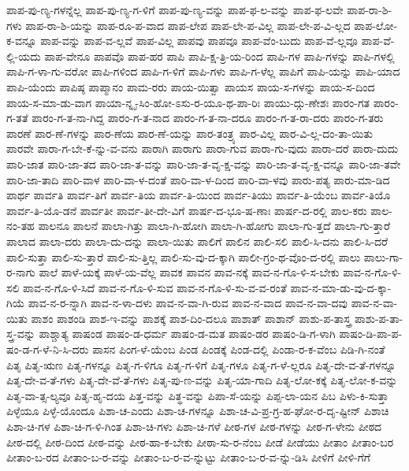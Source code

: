 {ಪಾಪ-ಪು-ಣ್ಯ-ಗಳನ್ನೆಲ್ಲ
ಪಾಪ-ಪು-ಣ್ಯ-ಗ-ಳಿಗೆ
ಪಾಪ-ಪು-ಣ್ಯ-ವನ್ನು
ಪಾಪ-ಫ-ಲ-ವನ್ನು
ಪಾಪ-ಫ-ಲವೇ
ಪಾಪ-ರಾ-ಶಿ-ಗಳು
ಪಾಪ-ರಾ-ಶಿ-ಯನ್ನು
ಪಾಪ-ರೂ-ಪ-ವಾದ
ಪಾಪ-ಲೇಪ
ಪಾಪ-ಲೇ-ಪ-ವಿಲ್ಲ
ಪಾಪ-ಲೇ-ಪ-ವಿ-ಲ್ಲದ
ಪಾಪ-ಲೋ-ಕ-ವನ್ನೂ
ಪಾಪ-ವನ್ನು
ಪಾಪ-ವ-ಲ್ಲವೆ
ಪಾಪ-ವಿಲ್ಲ
ಪಾಪವು
ಪಾಪವೂ
ಪಾಪ-ವೆಂ-ಬುದು
ಪಾಪ-ವೆ-ಲ್ಲವೂ
ಪಾಪ-ವೆ-ಲ್ಲಿ-ಯದು
ಪಾಪ-ವೇನೂ
ಪಾಪವೊ
ಪಾಪ-ಹರ
ಪಾಪಿ
ಪಾಪಿ-ಕ್ಷ-ತ್ರಿ-ಯ-ರಿಂದ
ಪಾಪಿ-ಗಳ
ಪಾಪಿ-ಗಳನ್ನು
ಪಾಪಿ-ಗಳಲ್ಲಿ
ಪಾಪಿ-ಗ-ಳಾ-ಗು-ವರೋ
ಪಾಪಿ-ಗಳಿಂದ
ಪಾಪಿ-ಗ-ಳಿಗೆ
ಪಾಪಿ-ಗಳು
ಪಾಪಿ-ಗ-ಳೆಲ್ಲ
ಪಾಪಿಗೆ
ಪಾಪಿ-ಯನ್ನು
ಪಾಪಿ-ಯಾದ
ಪಾಪಿ-ಯೆಂದು
ಪಾಪಿಷ್ಠ
ಪಾಪ್ಮಾನಂ
ಪಾಮ-ರರು
ಪಾಯ-ಯಿತ್ವಾ
ಪಾಯಸ
ಪಾಯ-ಸ-ಗಳನ್ನು
ಪಾಯ-ಸ-ದಿಂದ
ಪಾಯ-ಸ-ಮಾ-ಡು-ವಾಗ
ಪಾಯಾ-ನ್ನೃ-ಸಿಂ-ಹೋ-ಽಸು-ರ-ಯೂ-ಥ-ಪಾ-ರಿಃ
ಪಾಯು-ದ್ಗು-ಣೇಶಃ
ಪಾರಂ-ಗತ
ಪಾರಂ-ಗ-ತತೆ
ಪಾರಂ-ಗ-ತ-ನಾ-ಗಿದ್ದ
ಪಾರಂ-ಗ-ತ-ನಾದ
ಪಾರಂ-ಗ-ತ-ನಾ-ದರೂ
ಪಾರಂ-ಗ-ತ-ರಾ-ದರು
ಪಾರಂ-ಗ-ತರು
ಪಾರಣೆ
ಪಾರ-ಣೆ-ಗಳನ್ನು
ಪಾರ-ಣೆಯ
ಪಾರ-ಣೆ-ಯನ್ನು
ಪಾರ-ತಂತ್ರ್ಯ
ಪಾರ-ವಿಲ್ಲ
ಪಾರ-ವಿ-ಲ್ಲ-ದಂ-ತಾ-ಯಿತು
ಪಾರವೇ
ಪಾರಾ-ಗ-ಬೇ-ಕೆ-ನ್ನು-ವ-ವನು
ಪಾರಾಗಿ
ಪಾರಾಗು
ಪಾರಾ-ಗುವ
ಪಾರಾ-ಗು-ವುದು
ಪಾರಾ-ದರೆ
ಪಾರಾ-ದುದು
ಪಾರಿ-ಜಾತ
ಪಾರಿ-ಜಾ-ತದ
ಪಾರಿ-ಜಾ-ತ-ವನ್ನು
ಪಾರಿ-ಜಾ-ತ-ವೃ-ಕ್ಷ-ವನ್ನು
ಪಾರಿ-ಜಾ-ತ-ವೃ-ಕ್ಷ-ವನ್ನೂ
ಪಾರಿ-ಜಾ-ತವೇ
ಪಾರಿ-ಜಾ-ತಾದಿ
ಪಾರಿ-ವಾಳ
ಪಾರಿ-ವಾ-ಳ-ದಂತೆ
ಪಾರಿ-ವಾ-ಳ-ದಿಂದ
ಪಾರಿ-ವಾ-ಳವು
ಪಾರು-ಪತ್ಯ
ಪಾರು-ಮಾ-ಡಿದ
ಪಾರ್ಥ
ಪಾರ್ವತಿ
ಪಾರ್ವ-ತಿಗೆ
ಪಾರ್ವ-ತಿಯ
ಪಾರ್ವ-ತಿ-ಯಿಂದ
ಪಾರ್ವ-ತಿಯು
ಪಾರ್ವ-ತಿ-ಯೆಂಬ
ಪಾರ್ವ-ತಿಯೊ
ಪಾರ್ವ-ತಿ-ಯೊ-ಡನೆ
ಪಾರ್ವತೀ
ಪಾರ್ವ-ತೀ-ದೇ-ವಿಗೆ
ಪಾರ್ಷ-ದ-ಭೂ-ಷ-ಣಾಃ
ಪಾರ್ಷ-ದ-ರಲ್ಲಿ
ಪಾಲ-ಕರು
ಪಾಲ-ನಂ-ತಹ
ಪಾಲನೂ
ಪಾಲನೆ
ಪಾಲಾ-ಗಿತ್ತು
ಪಾಲಾ-ಗಿ-ಹೋಗಿ
ಪಾಲಾ-ಗಿ-ಹೋಗು
ಪಾಲಾ-ಗು-ತ್ತದೆ
ಪಾಲಾ-ಗು-ತ್ತಾರೆ
ಪಾಲಾದ
ಪಾಲಾ-ದರು
ಪಾಲಾ-ದು-ದನ್ನು
ಪಾಲಾ-ಯಿತು
ಪಾಲಿಗೆ
ಪಾಲಿನ
ಪಾಲಿ-ಸಲಿ
ಪಾಲಿ-ಸಿ-ದನು
ಪಾಲಿ-ಸಿ-ದರೆ
ಪಾಲಿ-ಸುತ್ತಾ
ಪಾಲಿ-ಸು-ತ್ತಾರೆ
ಪಾಲಿ-ಸು-ತ್ತಿಲ್ಲ
ಪಾಲಿ-ಸು-ವು-ದ-ಕ್ಕಾಗಿ
ಪಾಲೀ-ಗ್ರಂ-ಥ-ವೊಂ-ದ-ರಲ್ಲಿ
ಪಾಲು
ಪಾಲು-ಗಾ-ರ-ನಾಗು
ಪಾಲೆ
ಪಾಳೆ-ಯಕ್ಕೆ
ಪಾಳೆ-ಯ-ವೆಲ್ಲ
ಪಾವಕ
ಪಾವನ
ಪಾವ-ನಕ್ಕೆ
ಪಾವ-ನ-ಗೊ-ಳಿ-ಸ-ಬೇಕು
ಪಾವ-ನ-ಗೊ-ಳಿ-ಸಲಿ
ಪಾವ-ನ-ಗೊ-ಳಿ-ಸಿದೆ
ಪಾವ-ನ-ಗೊ-ಳಿ-ಸುವ
ಪಾವ-ನ-ಗೊ-ಳಿ-ಸು-ವ-ವ-ರಂತೆ
ಪಾವ-ನ-ಮಾ-ಡು-ವು-ದ-ಕ್ಕಾ-ಗಿಯೆ
ಪಾವ-ನ-ರ-ನ್ನಾಗಿ
ಪಾವ-ನ-ಳಾ-ದಳು
ಪಾವ-ನ-ವಾ-ಗಿ-ರುವ
ಪಾವ-ನ-ವಾದ
ಪಾವ-ನ-ವಾ-ದವು
ಪಾವ-ನ-ವಾ-ಯಿತು
ಪಾಶಂ
ಪಾಶಂಡಿ
ಪಾಶ-ಇ-ವನ್ನು
ಪಾಶಕ್ಕೆ
ಪಾಶ-ದಿಂ-ದಲೂ
ಪಾಶಾತ್
ಪಾಶಾನ್
ಪಾಶು-ಪ-ತಾಸ್ತ್ರ
ಪಾಶು-ಪ-ತಾ-ಸ್ತ್ರ-ವನ್ನು
ಪಾಶ್ಚಾತ್ಯ
ಪಾಷಂಡ
ಪಾಷಂ-ಡ-ಧರ್ಮ
ಪಾಷಂ-ಡ-ಮತ
ಪಾಷಂ-ಡರ
ಪಾಷಂ-ಡಿ-ಗ-ಳಾಗಿ
ಪಾಷಂ-ಡಿ-ಪಾ-ಪ-ಷಂ-ಡ-ಗ-ಳೆ-ನಿ-ಸಿ-ದರು
ಪಾಸನ
ಪಿಂಗ-ಳೆ-ಯೆಂಬ
ಪಿಂಡ
ಪಿಂಡಕ್ಕೆ
ಪಿಂಡ-ದಲ್ಲಿ
ಪಿಂಡಾ-ರ-ಕ-ವೆಂಬ
ಪಿಡಿ-ಗಿ-ನಂತೆ
ಪಿತೃ
ಪಿತೃ-ಋಣ
ಪಿತೃ-ಗಳನ್ನೂ
ಪಿತೃ-ಗ-ಳಿಗೂ
ಪಿತೃ-ಗ-ಳಿಗೆ
ಪಿತೃ-ಗಳೂ
ಪಿತೃ-ಗ-ಳೆ-ಲ್ಲರೂ
ಪಿತೃ-ದೇ-ವ-ತೆ-ಗಳನ್ನೂ
ಪಿತೃ-ದೇ-ವ-ತೆ-ಗಳು
ಪಿತೃ-ದೇ-ವೆ-ತೆ-ಗಳು
ಪಿತೃ-ಪು-ಣ-ವನ್ನು
ಪಿತೃ-ಯಾ-ಗಾದಿ
ಪಿತೃ-ಲೋ-ಕಕ್ಕೆ
ಪಿತೃ-ಲೋ-ಕ-ವನ್ನು
ಪಿತೃ-ವಾ-ತ್ಸ-ಲ್ಯವೂ
ಪಿತೃ-ಹೃ-ದಯ
ಪಿತ್ತ-ವನ್ನು
ಪಿತ್ಥ-ವನ್ನು
ಪಿಪಾ-ಸೆ-ಯನ್ನು
ಪಿಪ್ಪ-ಲಾ-ಯನ
ಪಿಬ
ಪಿಳು-ಕಿ-ಸುತ್ತಾ
ಪಿಳ್ಳೆಯೂ
ಪಿಳ್ಳೆ-ಯೊಂದೂ
ಪಿಶಾ-ಚ-ಎಂದು
ಪಿಶಾ-ಚ-ಗಳನ್ನೂ
ಪಿಶಾ-ಚ-ವಿ-ಪ್ರ-ಗ್ರ-ಹ-ಘೋ-ರ-ದೃ-ಷ್ಟೀನ್
ಪಿಶಾಚಿ
ಪಿಶಾ-ಚಿ-ಗಳ
ಪಿಶಾ-ಚಿ-ಗ-ಳಿ-ಗಿಂತ
ಪಿಶಾ-ಚಿ-ಗಳು
ಪಿಶಾ-ಚಿ-ಗಳೆ
ಪೀಠ-ಗಳ
ಪೀಠ-ಗಳನ್ನು
ಪೀಠ-ಗ-ಳೇನು
ಪೀಠದ
ಪೀಠ-ದಲ್ಲಿ
ಪೀಠ-ದಿಂದ
ಪೀಠ-ವನ್ನು
ಪೀಠ-ಹಾ-ಕ-ಬೇಕು
ಪೀಠಾ-ಸು-ರ-ನೆಂಬ
ಪೀಡೆ
ಪೀಡೆಯು
ಪೀತಾಂ
ಪೀತಾಂ-ಬರ
ಪೀತಾಂ-ಬ-ರದ
ಪೀತಾಂ-ಬ-ರ-ವನ್ನು
ಪೀತಾಂ-ಬ-ರ-ವ-ನ್ನುಟ್ಟು
ಪೀತಾಂ-ಬ-ರ-ವ-ನ್ನು-ಡಿಸಿ
ಪೀಳಿಗೆ
ಪೀಳಿ-ಗೆಗೆ
}
